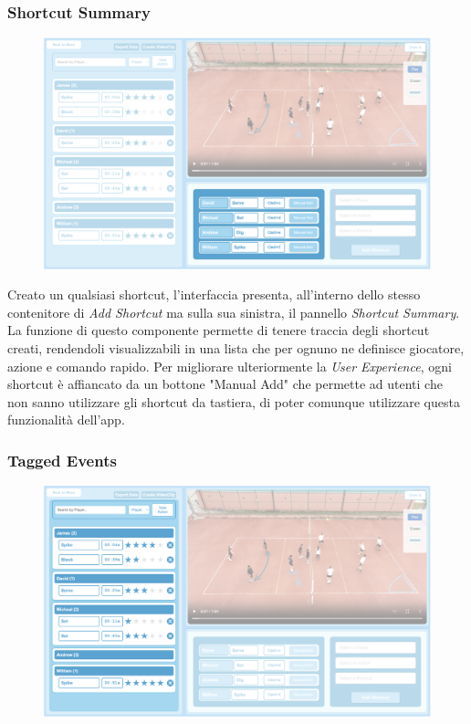 \subsubsection{Shortcut Summary}
\begin{figure}
    \centering
    \vspace{-0.4cm} %
    \includegraphics[width=\linewidth]{img/Summary.png}
    \label{fig:Enabled_shortcut}
\end{figure}

Creato un qualsiasi shortcut, l'interfaccia presenta, all'interno dello stesso contenitore di \textit{Add Shortcut} ma sulla sua sinistra, il pannello \textit{Shortcut Summary}. La funzione di questo componente permette di tenere traccia degli shortcut creati, rendendoli visualizzabili in una lista che per ognuno ne definisce giocatore, azione e comando rapido. Per migliorare ulteriormente la \textit{User Experience}, ogni shortcut è affiancato da un bottone "Manual Add" che permette ad utenti che non sanno utilizzare gli shortcut da tastiera, di poter comunque utilizzare questa funzionalità dell'app.

\subsubsection{Tagged Events}
\begin{figure}
    \centering
    \includegraphics[width=\linewidth]{img/activated_shortcut.png}
    \label{fig:activated_shortcut}
\end{figure}

